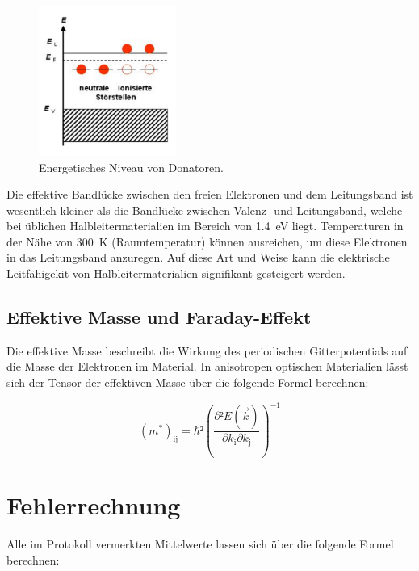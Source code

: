 \begin{figure}[H]
    \centering
    \includegraphics[width=0.4\textwidth]{nDot.png}
    \caption{Energetisches Niveau von Donatoren.}
    \label{fig:nDot}
\end{figure}

\noindent Die effektive Bandlücke zwischen den freien Elektronen und dem Leitungsband ist wesentlich kleiner als die Bandlücke 
zwischen Valenz- und Leitungsband, welche bei üblichen Halbleitermaterialien im Bereich von \qty{1.4}{\electronvolt} liegt. Temperaturen 
in der Nähe von \qty{300}{\kelvin} (Raumtemperatur) können ausreichen, um diese Elektronen in das Leitungsband anzuregen. 
Auf diese Art und Weise kann die elektrische Leitfähigekit von Halbleitermaterialien signifikant gesteigert werden. 

\subsection{Effektive Masse und Faraday-Effekt}

\noindent Die effektive Masse beschreibt die Wirkung des periodischen Gitterpotentials auf die Masse der Elektronen im Material.
In anisotropen optischen Materialien lässt sich der Tensor der effektiven Masse über die folgende Formel berechnen:

\begin{equation}
    (m^{\ast})_{\text{ij}} = \hbar²(\frac{\partial²E(\vec{k})}{\partial{}k_{\text{i}}\partial{}k_{\text{j}}})^{-1}
    \label{eqn:meff}
\end{equation}

\section{Fehlerrechnung}
\label{sec:Fehlerrechnung}

Alle im Protokoll vermerkten Mittelwerte lassen sich über die folgende Formel berechnen:

